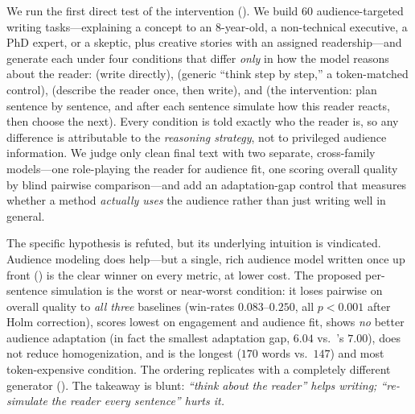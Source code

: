  We run the first direct test of the intervention (). We
build 60 audience-targeted writing tasks---explaining a concept to an 8-year-old, a non-technical
executive, a PhD expert, or a skeptic, plus creative stories with an assigned readership---and
generate each under four conditions that differ \emph{only} in how the model reasons about the
reader: \plain (write directly), \cot (generic ``think step by step,'' a token-matched control),
\simtom (describe the reader once, then write), and \persentence (the intervention: plan
sentence by sentence, and after each sentence simulate how this reader reacts, then choose the
next). Every condition is told exactly who the reader is, so any difference is attributable to
the \emph{reasoning strategy}, not to privileged audience information. We judge only clean final
text with two separate, cross-family models---one role-playing the reader for audience fit, one
scoring overall quality by blind pairwise comparison---and add an adaptation-gap control that
measures whether a method \emph{actually uses} the audience rather than just writing well in
general.

 The specific hypothesis is refuted, but its underlying intuition is
vindicated. Audience modeling does help---but a single, rich audience model written once up front
(\simtom) is the clear winner on every metric, at lower cost. The proposed per-sentence
simulation is the worst or near-worst condition: it loses pairwise on overall quality to
\emph{all three} baselines (win-rates $0.083$--$0.250$, all $p<0.001$ after Holm correction),
scores lowest on engagement and audience fit, shows \emph{no} better audience adaptation (in fact
the smallest adaptation gap, $6.04$ vs.\ \simtom's $7.00$), does not reduce homogenization, and
is the longest ($170$ words vs.\ $147$) and most token-expensive condition. The ordering
replicates with a completely different generator (\llama). The takeaway is blunt: \emph{``think
about the reader'' helps writing; ``re-simulate the reader every sentence'' hurts it.}

